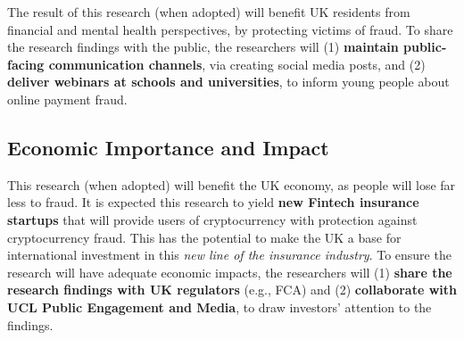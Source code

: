 The result of this research (when adopted) will benefit UK residents from financial and mental health perspectives, by protecting victims of fraud. To share the research findings with the public, the researchers will (1) \textbf{maintain public-facing communication channels}, via creating social media posts, and (2) \textbf{deliver webinars at schools and universities}, to inform young people about online payment fraud.   






\subsection{Economic Importance and Impact}
This research (when adopted) will benefit the UK economy, as people will lose far less to fraud. It is expected this research to yield \textbf{new Fintech insurance startups} that will provide users of cryptocurrency with protection against cryptocurrency fraud. This has the potential to make the UK a base for international investment in this \emph{new line of the insurance industry}. To ensure the research will have adequate economic impacts, the researchers will (1) \textbf{share the research findings with UK regulators} (e.g., FCA) and (2) \textbf{collaborate with UCL Public Engagement and Media}, to draw investors' attention to the findings.



%
%
%

